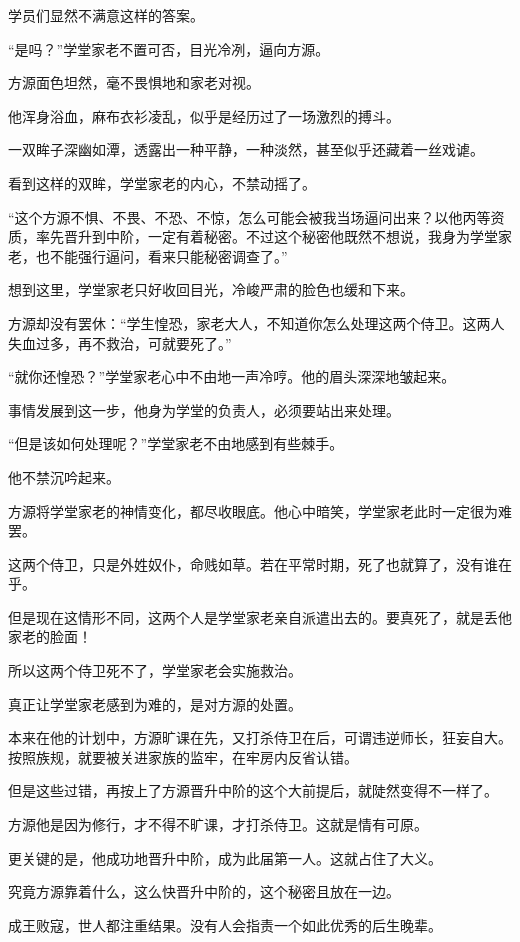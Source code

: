 \begin{this_body}
学员们显然不满意这样的答案。

“是吗？”学堂家老不置可否，目光冷冽，逼向方源。

方源面色坦然，毫不畏惧地和家老对视。

他浑身浴血，麻布衣衫凌乱，似乎是经历过了一场激烈的搏斗。

一双眸子深幽如潭，透露出一种平静，一种淡然，甚至似乎还藏着一丝戏谑。

看到这样的双眸，学堂家老的内心，不禁动摇了。

“这个方源不惧、不畏、不恐、不惊，怎么可能会被我当场逼问出来？以他丙等资质，率先晋升到中阶，一定有着秘密。不过这个秘密他既然不想说，我身为学堂家老，也不能强行逼问，看来只能秘密调查了。”

想到这里，学堂家老只好收回目光，冷峻严肃的脸色也缓和下来。

方源却没有罢休：“学生惶恐，家老大人，不知道你怎么处理这两个侍卫。这两人失血过多，再不救治，可就要死了。”

“就你还惶恐？”学堂家老心中不由地一声冷哼。他的眉头深深地皱起来。

事情发展到这一步，他身为学堂的负责人，必须要站出来处理。

“但是该如何处理呢？”学堂家老不由地感到有些棘手。

他不禁沉吟起来。

方源将学堂家老的神情变化，都尽收眼底。他心中暗笑，学堂家老此时一定很为难罢。

这两个侍卫，只是外姓奴仆，命贱如草。若在平常时期，死了也就算了，没有谁在乎。

但是现在这情形不同，这两个人是学堂家老亲自派遣出去的。要真死了，就是丢他家老的脸面！

所以这两个侍卫死不了，学堂家老会实施救治。

真正让学堂家老感到为难的，是对方源的处置。

本来在他的计划中，方源旷课在先，又打杀侍卫在后，可谓违逆师长，狂妄自大。按照族规，就要被关进家族的监牢，在牢房内反省认错。

但是这些过错，再按上了方源晋升中阶的这个大前提后，就陡然变得不一样了。

方源他是因为修行，才不得不旷课，才打杀侍卫。这就是情有可原。

更关键的是，他成功地晋升中阶，成为此届第一人。这就占住了大义。

究竟方源靠着什么，这么快晋升中阶的，这个秘密且放在一边。

成王败寇，世人都注重结果。没有人会指责一个如此优秀的后生晚辈。


\end{this_body}
